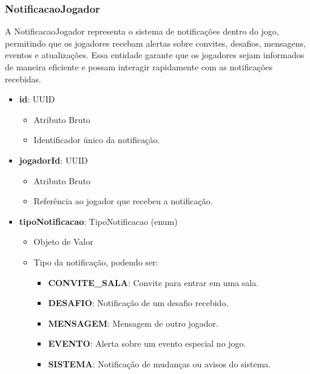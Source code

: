     \subsubsection{NotificacaoJogador}
    A NotificacaoJogador representa o sistema de notificações dentro do jogo, permitindo que os jogadores recebam alertas sobre convites, desafios, mensagens, eventos e atualizações. Essa entidade garante que os jogadores sejam informados de maneira eficiente e possam interagir rapidamente com as notificações recebidas.

    \begin{itemize}
        \item \textbf{id}: UUID  
              \begin{itemize}
                  \item Atributo Bruto
                  \item Identificador único da notificação.
              \end{itemize}
    
        \item \textbf{jogadorId}: UUID  
              \begin{itemize}
                  \item Atributo Bruto
                  \item Referência ao jogador que recebeu a notificação.
              \end{itemize}
    
        \item \textbf{tipoNotificacao}: TipoNotificacao (enum)  
              \begin{itemize}
                  \item Objeto de Valor
                  \item Tipo da notificação, podendo ser:
                  \begin{itemize}
                      \item \textbf{CONVITE\_SALA}: Convite para entrar em uma sala.
                      \item \textbf{DESAFIO}: Notificação de um desafio recebido.
                      \item \textbf{MENSAGEM}: Mensagem de outro jogador.
                      \item \textbf{EVENTO}: Alerta sobre um evento especial no jogo.
                      \item \textbf{SISTEMA}: Notificação de mudanças ou avisos do sistema.
                  \end{itemize}
              \end{itemize}
    

\end{itemize}
